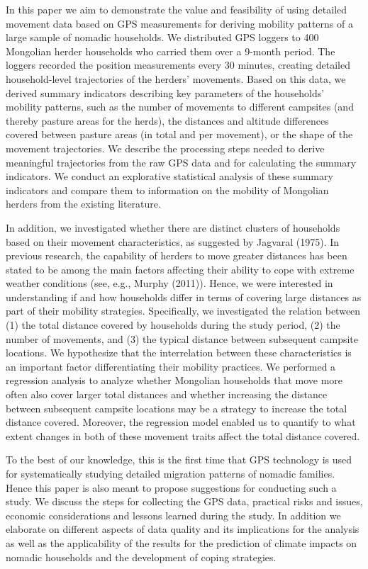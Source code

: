 \documentclass[]{elsarticle} %
\begin{document}
In this paper we aim to demonstrate the value and feasibility of using
detailed movement data based on GPS measurements for deriving mobility
patterns of a large sample of nomadic households. We distributed GPS
loggers to 400 Mongolian herder households who carried them over a
9-month period. The loggers recorded the position measurements every 30
minutes, creating detailed household-level trajectories of the herders'
movements. Based on this data, we derived summary indicators describing
key parameters of the households' mobility patterns, such as the number
of movements to different campsites (and thereby pasture areas for the
herds), the distances and altitude differences covered between pasture
areas (in total and per movement), or the shape of the movement
trajectories. We describe the processing steps needed to derive
meaningful trajectories from the raw GPS data and for calculating the
summary indicators. We conduct an explorative statistical analysis of
these summary indicators and compare them to information on the mobility
of Mongolian herders from the existing literature.

In addition, we investigated whether there are distinct clusters of
households based on their movement characteristics, as suggested by
Jagvaral (1975). In previous research, the capability of herders to move
greater distances has been stated to be among the main factors affecting
their ability to cope with extreme weather conditions (see, e.g., Murphy
(2011)). Hence, we were interested in understanding if and how
households differ in terms of covering large distances as part of their
mobility strategies. Specifically, we investigated the relation between
(1) the total distance covered by households during the study period,
(2) the number of movements, and (3) the typical distance between
subsequent campsite locations. We hypothesize that the interrelation
between these characteristics is an important factor differentiating
their mobility practices. We performed a regression analysis to analyze
whether Mongolian households that move more often also cover larger
total distances and whether increasing the distance between subsequent
campsite locations may be a strategy to increase the total distance
covered. Moreover, the regression model enabled us to quantify to what
extent changes in both of these movement traits affect the total
distance covered.

To the best of our knowledge, this is the first time that GPS technology
is used for systematically studying detailed migration patterns of
nomadic families. Hence this paper is also meant to propose suggestions
for conducting such a study. We discuss the steps for collecting the GPS
data, practical risks and issues, economic considerations and lessons
learned during the study. In addition we elaborate on different aspects
of data quality and its implications for the analysis as well as the
applicability of the results for the prediction of climate impacts on
nomadic households and the development of coping strategies.
\end{document}
